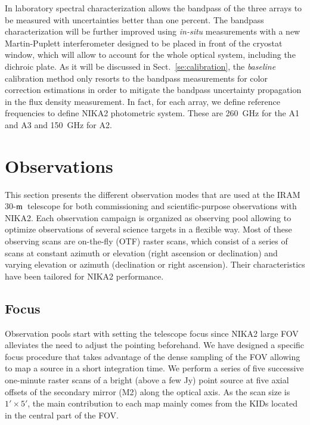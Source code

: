 \documentclass[traditionalabstract]{aa}
\newcommand{\trentemetre}{30-$\rm{m}$}
\newcommand{\lp}[1]{#1}
\begin{document}
{\lp In laboratory spectral characterization allows the bandpass of the
three arrays to be measured with uncertainties better than one
percent. The bandpass characterization will be further improved using
\emph{in-situ} measurements with a new Martin-Puplett interferometer designed
to be placed in front of the cryostat window, which will allow to
account for the whole optical system, including the dichroic plate. As
it will be discussed in Sect.~\ref{se:calibration}, the \emph{baseline} calibration method
only resorts to the bandpass measurements for color correction
estimations in order to mitigate the bandpass uncertainty propagation
in the flux density measurement.}
In fact, for each array, we define reference frequencies 
to define NIKA2 photometric system. These are 260~GHz for the A1 and A3 and
150~GHz for A2.




\section{Observations}
\label{se:observations}
%

This section presents the different observation modes that are used at
the IRAM \trentemetre\ telescope for both commissioning and
scientific-purpose observations with NIKA2. {\lp Each observation
campaign is organized as observing pool allowing to optimize
observations of several science targets in a flexible way.}
Most of these observing scans are on-the-fly (OTF) raster scans,
which consist of a series of scans at constant azimuth or elevation
(right ascension or declination) and varying elevation or azimuth
(declination or right ascension).
Their characteristics have been tailored for NIKA2 performance.


\subsection{Focus}
\label{se:axial_focus}

Observation pools start with setting the telescope focus since NIKA2 large
FOV alleviates the need to adjust the pointing beforehand.  
We have designed a specific focus procedure that takes
advantage of the dense sampling of the FOV allowing to map a source
in a short integration time. We perform a series of five successive one-minute
raster scans of a bright (above a few Jy) point source at five
axial offsets of the secondary mirror (M2) along the optical
axis. As the scan size is $1'\times 5'$, the main contribution to each
map mainly comes from the KIDs located in the central part of the FOV.
\end{document}
